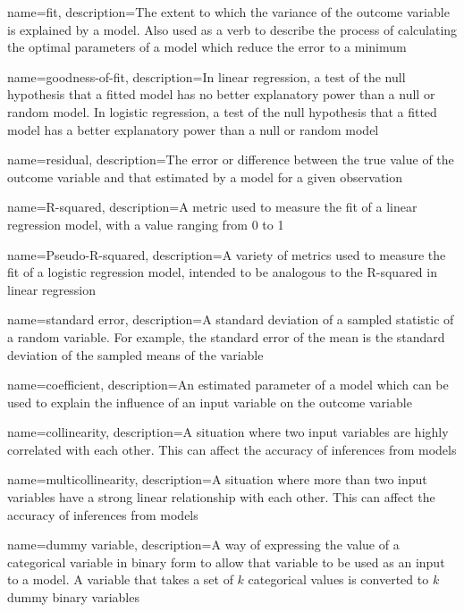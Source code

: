 {
    name={fit},
    description={The extent to which the variance of the outcome variable is explained by a model.  Also used as a verb to describe the process of calculating the optimal parameters of a model which reduce the error to a minimum}
}

{
    name={goodness-of-fit},
    description={In linear regression, a test of the null hypothesis that a fitted model has no better explanatory power than a null or random model.  In logistic regression, a test of the null hypothesis that a fitted model has a better explanatory power than a null or random model}
}

{
    name={residual},
    description={The error or difference between the true value of the outcome variable and that estimated by a model for a given observation}
}

{
    name={R-squared},
    description={A metric used to measure the fit of a linear regression model, with a value ranging from 0 to 1}
}

{
    name={Pseudo-R-squared},
    description={A variety of metrics used to measure the fit of a logistic regression model, intended to be analogous to the R-squared in linear regression}
}

{
    name={standard error},
    description={A standard deviation of a sampled statistic of a random variable.  For example, the standard error of the mean is the standard deviation of the sampled means of the variable}
}

{
    name={coefficient},
    description={An estimated parameter of a model which can be used to explain the influence of an input variable on the outcome variable}
}

{
    name={collinearity},
    description={A situation where two input variables are highly correlated with each other.  This can affect the accuracy of inferences from models}
}

{
    name={multicollinearity},
    description={A situation where more than two input variables have a strong linear relationship with each other.  This can affect the accuracy of inferences from models}
}

{
    name={dummy variable},
    description={A way of expressing the value of a categorical variable in binary form to allow that variable to be used as an input to a model.  A variable that takes a set of $k$ categorical values is converted to $k$ dummy binary variables}
}

